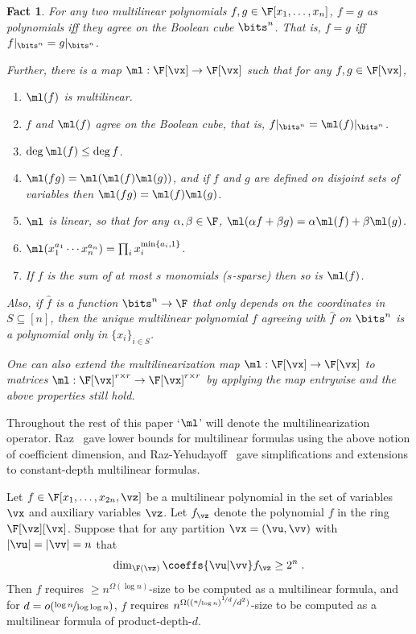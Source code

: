 \documentclass[11pt]{article}
\numberwithin{equation}{section}
\newtheorem{fact}[theorem]{Fact}
\theoremstyle{definition}
\theoremstyle{plain}
\begin{document}
\begin{fact}\label{fact:multilinearization}
        For any two multilinear polynomials $f,g\in\F[x_1,\ldots,x_n]$, $f=g$ as polynomials iff they agree on the Boolean cube $\bits^n$.  That is, $f=g$ iff  $f|_{\bits^n}=g|_{\bits^n}$.

        Further, there is a  map $\ml:\F[\vx]\to\F[\vx]$ such that for any $f,g\in\F[\vx]$,
        \begin{enumerate}
                \item $\ml(f)$ is multilinear.
                \item $f$ and $\ml(f)$ agree on the Boolean cube, that is, $f|_{\bits^n}=\ml(f)|_{\bits^n}$.
                \item $\deg \ml(f)\le \deg f$.
                \item $\ml(fg)=\ml(\ml(f)\ml(g))$, and if $f$ and $g$ are defined on disjoint sets of variables then $\ml(fg)= \ml(f)\ml(g)$.
                \item $\ml$ is linear, so that for any $\alpha,\beta\in \F$, $\ml(\alpha f+\beta g)=\alpha \ml(f)+\beta\ml(g)$.
                \item $\ml(x_1^{a_1}\cdots x_n^{a_n})=\prod_i x_i^{\min\{a_i,1\}}$.
                \item If $f$ is the sum of at most $s$ monomials ($s$-sparse) then so is $\ml(f)$.
        \end{enumerate}
        Also, if $\hat{f}$ is a function $\bits^n\to\F$ that only depends on the coordinates in $S\subseteq[n]$, then the unique multilinear polynomial $f$ agreeing with $\hat{f}$ on $\bits^n$ is a polynomial only in $\{x_i\}_{i\in S}$.

        One can also extend the multilinearization map $\ml:\F[\vx]\to\F[\vx]$ to matrices $\ml:\F[\vx]^{r\times r}\to\F[\vx]^{r\times r}$ by applying the map
%
entrywise   %
and the above properties still hold.
\end{fact}

Throughout the rest of this paper `$\ml$' will denote the multilinearization operator. Raz~\cite{Raz09,Raz06} gave lower bounds for multilinear formulas using the above notion of coefficient dimension, and Raz-Yehudayoff~\cite{RazYehudayoff08,RazYehudayoff09} gave simplifications and extensions to constant-depth multilinear formulas.

\begin{theoremwp}\label{thm:full-rank-lb}
        Let $f\in\F[x_1,\ldots,x_{2n},\vz]$ be a multilinear polynomial in the set of variables $\vx$ and auxiliary variables $\vz$.  Let $f_\vz$ denote the polynomial $f$ in the ring $\F[\vz][\vx]$.  Suppose that for any partition $\vx=(\vu,\vv)$ with $|\vu|=|\vv|=n$ that
        \[
                \dim_{\F(\vz)} \coeffs{\vu|\vv} f_\vz \ge 2^n
                \;.
        \]
        Then $f$ requires $\ge n^{\Omega(\log n)}$-size to be computed as a multilinear formula, and for $d=o(\nicefrac{\log n}{\log\log n})$, $f$ requires $n^{\Omega((\nicefrac{n}{\log n})^{\nicefrac{1}{d}}/d^2)}$-size to be computed as a multilinear formula of product-depth-$d$.
\end{theoremwp}
\end{document}
